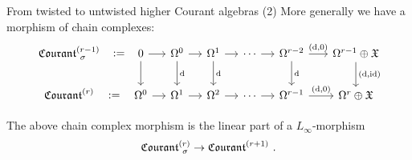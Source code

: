 \documentclass[beamer,10pt]{standalone}
\begin{document}
\begin{frame}{From twisted to untwisted higher Courant algebras (2)}
	More generally we have a morphism of chain complexes:
	\begin{displaymath}
		\begin{tikzcd}[ampersand replacement=\&,column sep = small]
			\Courant[\sigma]{r-1} \ar[r,phantom,":="] %
			\&[1em]
			0 \ar[r] \ar[d]
			\& \Omega^0 \ar[d,"\d"] \ar[r]
			\& \Omega^1 \ar[d,"\d"] \ar[r]
			\& \cdots \ar[r]
			\& \Omega^{r-2} \ar[d,"\d"] \ar[r,"{(\d,0)}"]
			\&[.5em]  \Omega^{r-1} \oplus \X \ar[d,"{(\d,\id)}"]
			\\
			\Courant{r} \ar[r,phantom,":="]
			\& \Omega^0 \ar[r]
			\& \Omega^1 \ar[r]
			\& \Omega^2 \ar[r]
			\& \cdots \ar[r]
			\& \Omega^{r-1} \ar[r,"{(\d,0)}"]
			\&\Omega^{r} \oplus \X
		\end{tikzcd}
	\end{displaymath}

	\vfill\pause

	\begin{thmblock}[{[Fiorenza-M. 2025]}]
		The above chain complex morphism is the linear part of a $L_\infty$-morphism $$\Courant[\sigma]{r} \to \Courant{r+1}~.$$
	\end{thmblock}

	\vfill
\end{frame}
\end{document}
